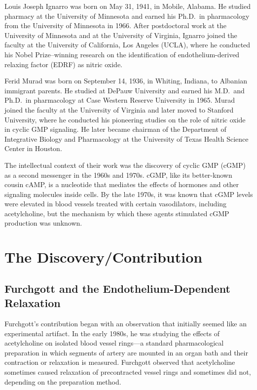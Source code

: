 Louis Joseph Ignarro was born on May 31, 1941, in Mobile, Alabama. He studied pharmacy at the University of Minnesota and earned his Ph.D.\ in pharmacology from the University of Minnesota in 1966. After postdoctoral work at the University of Minnesota and at the University of Virginia, Ignarro joined the faculty at the University of California, Los Angeles (UCLA), where he conducted his Nobel Prize--winning research on the identification of endothelium-derived relaxing factor (EDRF) as nitric oxide.

Ferid Murad was born on September 14, 1936, in Whiting, Indiana, to Albanian immigrant parents. He studied at DePauw University and earned his M.D.\ and Ph.D.\ in pharmacology at Case Western Reserve University in 1965. Murad joined the faculty at the University of Virginia and later moved to Stanford University, where he conducted his pioneering studies on the role of nitric oxide in cyclic GMP signaling. He later became chairman of the Department of Integrative Biology and Pharmacology at the University of Texas Health Science Center in Houston.

The intellectual context of their work was the discovery of cyclic GMP (cGMP) as a second messenger in the 1960s and 1970s. cGMP, like its better-known cousin cAMP, is a nucleotide that mediates the effects of hormones and other signaling molecules inside cells. By the late 1970s, it was known that cGMP levels were elevated in blood vessels treated with certain vasodilators, including acetylcholine, but the mechanism by which these agents stimulated cGMP production was unknown.

\section{The Discovery/Contribution}

\subsection{Furchgott and the Endothelium-Dependent Relaxation}

Furchgott's contribution began with an observation that initially seemed like an experimental artifact. In the early 1980s, he was studying the effects of acetylcholine on isolated blood vessel rings---a standard pharmacological preparation in which segments of artery are mounted in an organ bath and their contraction or relaxation is measured. Furchgott observed that acetylcholine sometimes caused relaxation of precontracted vessel rings and sometimes did not, depending on the preparation method.

